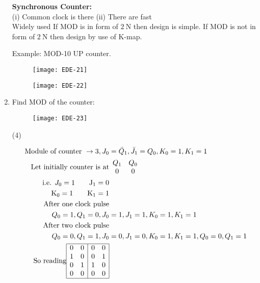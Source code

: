 \begin{enumerate}
\begin{answer}
 		\textbf{Synchronous Counter:}\\
 		(i) Common clock is there (ii) There are fast\\
 		Widely used If MOD is in form of $2 \mathrm{~N}$ then design is simple. If MOD is not in form of $2 \mathrm{~N}$ then design by use of K-map.
 	\end{answer}
	Example: MOD-10 UP counter.
	\begin{figure}[H]
		\centering
		\texttt{[image: EDE-21]}
	\end{figure}
\begin{figure}[H]
	\centering
	\texttt{[image: EDE-22]}
\end{figure}
 	\item Find MOD of the counter:
 	\begin{figure}[H]
 		\centering
 		\texttt{[image: EDE-23]}
 	\end{figure}
 	 \begin{tasks}(4)
 	\end{tasks}
 	\begin{answer}
 		\begin{align*}
 		\text { Module of counter } \rightarrow 3, J_{0}&=\bar{Q}_{1}, \bar{J}_{1}=Q_{0}, K_{0}=1, K_{1}=1\\
 	\text{	Let initially counter is at}&
 		\begin{array}{cc}Q_{1} & Q_{0} \\ 0 & 0\end{array}\\
 		\text{i.e. }J_{0}=1
 		\qquad\mathrm{J}_{1}=0\\
 		\mathrm{K}_{0}=1
 		\qquad\mathrm{K}_{1}=1\\
 		\text{After one clock pulse}\\
 		Q_{0}=1, Q_{1}=0, J_{0}&=1, J_{1}=1, K_{0}=1, K_{1}=1\\
 		\text{After two clock pulse}\\
 		Q_{0}=0, Q_{1}=1, J_{0}&=0, J_{1}=0, K_{0}=1, K_{1}=1, Q_{0}=0, Q_{1}=1\\
 		\text{So reading}\begin{array}{|ll|ll|}
 		\hline 0 & 0 & 0 & 0 \\
 		1 & 0 & 0 & 1 \\
 		0 & 1 & 1 & 0 \\
 		0 & 0 & 0 & 0 \\
 		\hline

\end{array}
\end{align*}
\end{answer}
\end{enumerate}

